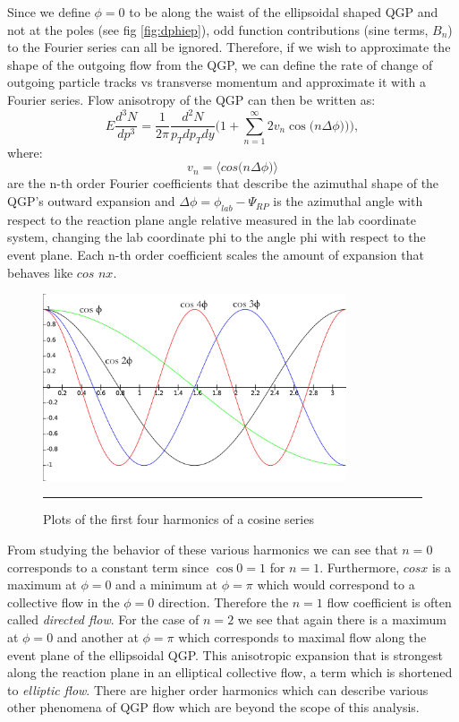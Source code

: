 Since we define $\phi=0$ to be along the waist of the ellipsoidal shaped QGP and not at the poles (see fig \ref{fig:dphiep}), odd function contributions (sine terms, $B_{n}$) to the Fourier series can all be ignored. Therefore, if we wish to approximate the shape of the outgoing flow from the QGP, we can define the rate of change of outgoing particle tracks vs transverse momentum and approximate it with a Fourier series. Flow anisotropy of the QGP can then be written as:
\begin{equation}
E \frac{d^{3}N}{dp^{3}} = \frac{1}{2 \pi} \frac{d^{2}N}{p_{T} dp_{T}dy}\Big( 1 + \sum^{\infty}_{n=1} 2 v_{n} \cos\big(n \Delta \phi)\big) \Big),
\end{equation}
where:
\begin{equation}
v_{n} = \bigg \langle cos \Big( n \Delta\phi \Big) \bigg \rangle
\end{equation}
are the n-th order Fourier coefficients that describe the azimuthal shape of the QGP's outward expansion and $\Delta \phi = \phi_{lab} - \Psi_{RP}$ is the azimuthal angle with respect to the reaction plane angle relative measured in the lab coordinate system, changing the lab coordinate phi to the angle phi with respect to the event plane. Each n-th order coefficient scales the amount of expansion that behaves like $cos$ $nx$.

\begin{figure}[htbp!]
  \centering
    \includegraphics[width=0.8\textwidth]{Figures/fouriercosines.jpg}
    \rule{35em}{0.5pt}
  \caption[Plots of the first four harmonics of a cosine series]{Plots of the first four harmonics of a cosine series}
  \label{fig:fouriercosines}
\end{figure}

From studying the behavior of these various harmonics we can see that $n=0$ corresponds to a constant term since $\cos{0} = 1$ for $n=1$. Furthermore, $cos x$ is a maximum at $\phi=0$ and a minimum at $\phi = \pi$ which would correspond to a collective flow in the $\phi=0$ direction. Therefore the $n=1$ flow coefficient is often called \textit{directed flow}. For the case of $n=2$ we see that again there is a maximum at $\phi=0$ and another at $\phi=\pi$ which corresponds to maximal flow along the event plane of the ellipsoidal QGP. This anisotropic expansion that is strongest along the reaction plane in an elliptical collective flow, a term which is shortened to \textit{elliptic flow}. There are higher order harmonics which can describe various other phenomena of QGP flow which are beyond the scope of this analysis.



\pagebreak
\pagebreak
